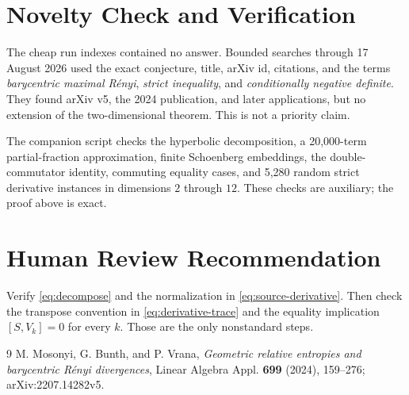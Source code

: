 \documentclass[11pt]{article}
\begin{document}
\section*{Novelty Check and Verification}

The cheap run indexes contained no answer.  Bounded searches through
17 August 2026 used the exact conjecture, title, arXiv id, citations, and
the terms \emph{barycentric maximal R\'enyi}, \emph{strict inequality}, and
\emph{conditionally negative definite}.  They found arXiv v5, the 2024
publication, and later applications, but no extension of the
two-dimensional theorem.  This is not a priority claim.

The companion script checks the hyperbolic decomposition, a 20,000-term
partial-fraction approximation, finite Schoenberg embeddings, the
double-commutator identity, commuting equality cases, and 5,280 random
strict derivative instances in dimensions $2$ through $12$.  These checks
are auxiliary; the proof above is exact.

\section*{Human Review Recommendation}

Verify \eqref{eq:decompose} and the normalization in
\eqref{eq:source-derivative}.  Then check the transpose convention in
\eqref{eq:derivative-trace} and the equality implication
$[S,V_k]=0$ for every $k$.  Those are the only nonstandard steps.

\begin{thebibliography}{9}
\small
{}
M. Mosonyi, G. Bunth, and P. Vrana,
\emph{Geometric relative entropies and barycentric R\'enyi divergences},
Linear Algebra Appl. \textbf{699} (2024), 159--276;
arXiv:2207.14282v5.
\end{thebibliography}
\end{document}
